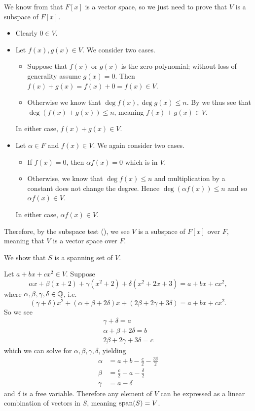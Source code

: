 \begin{questions}
    \item We know from  that $F[x]$ is a vector space, so we just need to prove that $V$ is a subspace of $F[x]$.
    \begin{itemize}
        \item Clearly $0 \in V$.
        \item Let $f(x), g(x) \in V$. We consider two cases.
        \begin{itemize}
            \item Suppose that $f(x)$ or $g(x)$ is the zero polynomial; without loss of generality assume $g(x) = 0$. Then $f(x) + g(x) = f(x) + 0 = f(x) \in V$.
            \item Otherwise we know that $\deg f(x), \deg g(x) \leq n$. By  we thus see that $\deg (f(x) + g(x)) \leq n$, meaning $f(x) + g(x) \in V$.
        \end{itemize}
        In either case, $f(x) + g(x) \in V$.
        \item Let $\alpha \in F$ and $f(x) \in V$. We again consider two cases.
        \begin{itemize}
            \item If $f(x) = 0$, then $\alpha f(x) = 0$ which is in $V$.
            \item Otherwise, we know that $\deg f(x) \leq n$ and multiplication by a constant does not change the degree. Hence $\deg (\alpha f(x)) \leq n$ and so $\alpha f(x) \in V$.
        \end{itemize}
        In either case, $\alpha f(x) \in V$.
    \end{itemize}
    Therefore, by the subspace test (), we see $V$ is a subspace of $F[x]$ over $F$, meaning that $V$ is a vector space over $F$.

    \item We show that $S$ is a spanning set of $V$.

    Let $a + bx + cx^2 \in V$. Suppose
    \[
        \alpha x + \beta(x + 2) + \gamma(x^2 + 2) + \delta(x^2 + 2x + 3) = a + bx + cx^2,
    \]
    where $\alpha, \beta, \gamma, \delta \in \mathbb{Q}$, i.e.
    \[
        (\gamma + \delta)x^2 + (\alpha + \beta + 2\delta)x + (2\beta + 2\gamma + 3\delta) = a + bx + cx^2.
    \]
    So we see
    \begin{align*}
        \gamma + \delta = a\\
        \alpha + \beta + 2\delta = b\\
        2\beta + 2\gamma + 3\delta = c
    \end{align*}
    which we can solve for $\alpha, \beta, \gamma, \delta$, yielding
    \begin{align*}
        \alpha &= a + b - \frac{c}{2} - \frac{3\delta}{2}\\
        \beta &= \frac{c}{2} - a - \frac{\delta}{2}\\
        \gamma &= a - \delta
    \end{align*}
    and $\delta$ is a free variable. Therefore any element of $V$ can be expressed as a linear combination of vectors in $S$, meaning $\mathrm{span}(S) = V$.


\end{questions}
